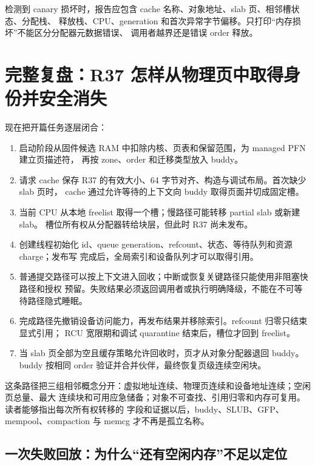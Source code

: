 检测到 canary 损坏时，报告应包含 cache 名称、对象地址、slab 页、相邻槽状态、分配栈、
释放栈、CPU、generation 和首次异常字节偏移。只打印“内存损坏”不能区分分配器元数据错误、
调用者越界还是错误 order 释放。

\section{完整复盘：R37 怎样从物理页中取得身份并安全消失}

现在把开篇任务逐层闭合：

\begin{enumerate}
\item 启动阶段从固件候选 RAM 中扣除内核、页表和保留范围，为 managed PFN 建立页描述符，
      再按 zone、order 和迁移类型放入 buddy。
\item 请求 cache 保存 R37 的有效大小、64 字节对齐、构造与调试布局。首次缺少 slab 页时，
      cache 通过允许等待的上下文向 buddy 取得页面并切成固定槽。
\item 当前 CPU 从本地 freelist 取得一个槽；慢路径可能转移 partial slab 或新建 slab。
      槽位所有权从分配器转给块层，但此时 R37 尚未发布。
\item 创建线程初始化 id、queue generation、refcount、状态、等待队列和资源 charge；发布写
      完成后，全局索引和设备队列才可以取得引用。
\item 普通提交路径可以按上下文进入回收；中断或恢复关键路径只能使用非阻塞快路径和授权
      预留。失败结果必须返回调用者或执行明确降级，不能在不可等待路径隐式睡眠。
\item 完成路径先撤销设备访问能力，再发布结果并移除索引。refcount 归零只结束显式引用；
      RCU 宽限期和调试 quarantine 结束后，槽位才回到 freelist。
\item 当 slab 页全部为空且缓存策略允许回收时，页才从对象分配器退回 buddy。buddy 按相同
      order 验证并合并伙伴，最终恢复页级连续空闲块。
\end{enumerate}

这条路径把三组相邻概念分开：虚拟地址连续、物理页连续和设备地址连续；空闲页总量、最大
连续块和可用应急储备；对象不可查找、引用归零和内存可复用。读者能够指出每次所有权转移的
字段和证据以后，buddy、SLUB、GFP、mempool、compaction 与 memcg 才不再是孤立名称。

\subsection{一次失败回放：为什么“还有空闲内存”不足以定位}

